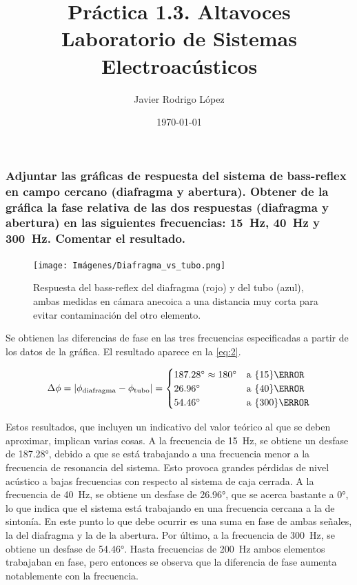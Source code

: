 \documentclass[10pt]{article}
\title{\Huge Práctica 1.3. Altavoces \\\huge Laboratorio de Sistemas Electroacústicos}
\author{Javier Rodrigo López}
\date{\today}
\begin{document}
\maketitle
\setcounter{subsubsection}{8}

\subsubsection{Adjuntar las gráficas de respuesta del sistema de bass-reflex en campo cercano (diafragma y abertura). Obtener de la gráfica la fase relativa de las dos respuestas (diafragma y abertura) en las siguientes frecuencias: \qty{15}{\hertz }, \qty{40}{\hertz } y \qty{300}{\hertz }. Comentar el resultado.}

\begin{figure}[hbtp]
  \centering
  \texttt{[image: Imágenes/Diafragma\_vs\_tubo.png]}
  \caption{Respuesta del bass-reflex del diafragma (rojo) y del tubo (azul), ambas medidas en cámara anecoica a una distancia muy corta para evitar contaminación del otro elemento.}
  \label{fig:Diafragma_vs_tubo.png}
\end{figure}

Se obtienen las diferencias de fase en las tres frecuencias especificadas a partir de los datos de la gráfica. El resultado aparece en la \autoref{eq:2}.

\begin{equation} \label{eq:2}
  \Delta \phi = \abs{\phi_{\text{diafragma}} - \phi_{\text{tubo}}} = \begin{cases}
    \ang{187,28} \approx \ang{180} & \text{a }\qty{15}{\hertz }  \\
    \ang{26,96}                    & \text{a }\qty{40}{\hertz }  \\
    \ang{54.46}                    & \text{a }\qty{300}{\hertz }
  \end{cases}
\end{equation}

Estos resultados, que incluyen un indicativo del valor teórico al que se deben aproximar, implican varias cosas. A la frecuencia de \qty{15}{\hertz }, se obtiene un desfase de \ang{187.28}, debido a que se está trabajando a una frecuencia menor a la frecuencia de resonancia del sistema. Esto provoca grandes pérdidas de nivel acústico a bajas frecuencias con respecto al sistema de caja cerrada. A la frecuencia de \qty{40}{\hertz }, se obtiene un desfase de \ang{26.96}, que se acerca bastante a \ang{0}, lo que indica que el sistema está trabajando en una frecuencia cercana a la de sintonía. En este punto lo que debe ocurrir es una suma en fase de ambas señales, la del diafragma y la de la abertura. Por último, a la frecuencia de \qty{300}{\hertz }, se obtiene un desfase de \ang{54.46}. Hasta frecuencias de \qty{200}{\hertz } ambos elementos trabajaban en fase, pero entonces se observa que la diferencia de fase aumenta notablemente con la frecuencia.
\end{document}
